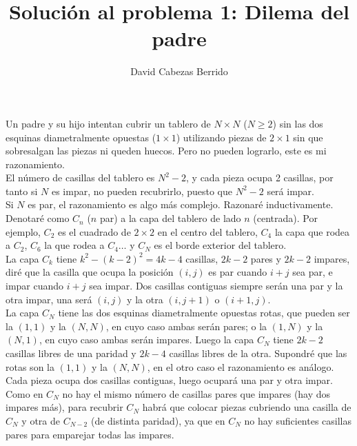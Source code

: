 \documentclass[12pt,spanish]{article}
\begin{document}
\title{Solución al problema 1: Dilema del padre}
\author{David Cabezas Berrido}
\date{\vspace{-5mm}}
\maketitle

Un padre y su hijo intentan cubrir un tablero de $N\times N$
($N\geq 2$) sin las dos esquinas diametralmente opuestas ($1\times 1$)
utilizando piezas de $2\times 1$ sin que sobresalgan las piezas ni
queden huecos. Pero no pueden lograrlo, este es mi razonamiento. \\

El número de casillas del tablero es $N^2-2$, y cada pieza ocupa 2
casillas, por tanto si $N$ es impar, no pueden recubrirlo, puesto
que $N^2-2$ será impar. \\

Si $N$ es par, el razonamiento es algo más complejo. Razonaré
inductivamente. \\

Denotaré como $C_n$ ($n$ par) a la capa del tablero de lado $n$
(centrada). Por ejemplo, $C_2$ es el cuadrado de $2\times 2$ en el
centro del tablero, $C_4$ la capa que rodea a $C_2$, $C_6$ la que
rodea a $C_4\ldots$ y $C_N$ es el borde exterior del tablero. \\

La capa $C_k$ tiene $k^2-(k-2)^2 = 4k-4$ casillas, $2k-2$ pares y
$2k-2$ impares, diré que la casilla que ocupa la posición $(i,j)$ es
par cuando $i+j$ sea par, e impar cuando $i+j$ sea impar. Dos casillas
contiguas siempre serán una par y la otra impar, una será $(i,j)$ y la
otra $(i,j+1)$ o $(i+1,j)$. \\

La capa $C_N$ tiene las dos esquinas diametralmente opuestas rotas, que
pueden ser la $(1,1)$ y la $(N,N)$, en cuyo caso ambas serán pares; o
la $(1,N)$ y la $(N,1)$, en cuyo caso ambas serán impares. Luego la
capa $C_N$ tiene $2k-2$ casillas libres de una paridad y $2k-4$
casillas libres de la otra. Supondré que las rotas son la $(1,1)$ y la
$(N,N)$, en el otro caso el razonamiento es análogo. \\

Cada pieza ocupa dos casillas contiguas, luego ocupará una par y otra
impar. Como en $C_N$ no hay el mismo número de casillas pares que
impares (hay dos impares más), para recubrir $C_N$ habrá que colocar
piezas cubriendo una casilla de $C_N$ y otra de $C_{N-2}$ (de distinta
paridad), ya que en $C_N$ no hay suficientes casillas pares para
emparejar todas las impares. \\
\end{document}
